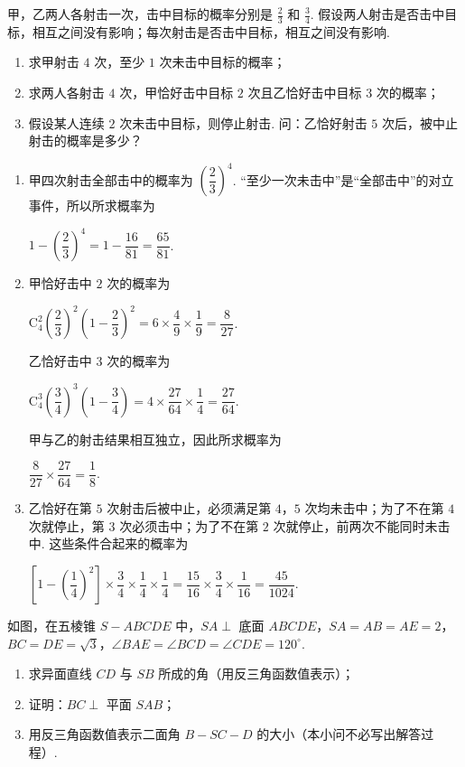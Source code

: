 \begin{problem}
甲，乙两人各射击一次，击中目标的概率分别是 \(\frac{2}{3}\) 和 \(\frac{3}{4}\). 假设两人射击是否击中目标，相互之间没有影响；每次射击是否击中目标，相互之间没有影响.
\begin{enumerate}
\item 求甲射击 \(4\) 次，至少 \(1\) 次未击中目标的概率；
\item 求两人各射击 \(4\) 次，甲恰好击中目标 \(2\) 次且乙恰好击中目标 \(3\) 次的概率；
\item 假设某人连续 \(2\) 次未击中目标，则停止射击. 问：乙恰好射击 \(5\) 次后，被中止射击的概率是多少？
\end{enumerate}
\end{problem}

\begin{solution}
\begin{enumerate}
\item 甲四次射击全部击中的概率为 \(\left(\dfrac23\right)^4\). “至少一次未击中”是“全部击中”的对立事件，所以所求概率为

\(1-\left(\dfrac23\right)^4=1-\dfrac{16}{81}=\dfrac{65}{81}\).
\item 甲恰好击中 \(2\) 次的概率为

\(\mathrm C_4^2\left(\dfrac23\right)^2\left(1-\dfrac23\right)^2=6\times\dfrac49\times\dfrac19=\dfrac{8}{27}\).

乙恰好击中 \(3\) 次的概率为

\(\mathrm C_4^3\left(\dfrac34\right)^3\left(1-\dfrac34\right)=4\times\dfrac{27}{64}\times\dfrac14=\dfrac{27}{64}\).

甲与乙的射击结果相互独立，因此所求概率为

\(\dfrac{8}{27}\times\dfrac{27}{64}=\dfrac18\).
\item 乙恰好在第 \(5\) 次射击后被中止，必须满足第 \(4\)，\(5\) 次均未击中；为了不在第 \(4\) 次就停止，第 \(3\) 次必须击中；为了不在第 \(2\) 次就停止，前两次不能同时未击中. 这些条件合起来的概率为

\(\left[1-\left(\dfrac14\right)^2\right]\times\dfrac34\times\dfrac14\times\dfrac14=\dfrac{15}{16}\times\dfrac34\times\dfrac1{16}=\dfrac{45}{1024}\).
\end{enumerate}
\end{solution}

\begin{problem}
如图，在五棱锥 \(S-ABCDE\) 中，\(SA \perp\) 底面 \(ABCDE\)，\(SA = AB = AE = 2\)，\(BC = DE = \sqrt{3}\)，\(\angle BAE = \angle BCD = \angle CDE = 120^{\circ}\).
\begin{enumerate}
\item 求异面直线 \(CD\) 与 \(SB\) 所成的角（用反三角函数值表示）；
\item 证明：\(BC \perp\) 平面 \(SAB\)；
\item 用反三角函数值表示二面角 \(B-SC-D\) 的大小（本小问不必写出解答过程）.
\end{enumerate}

\end{problem}

